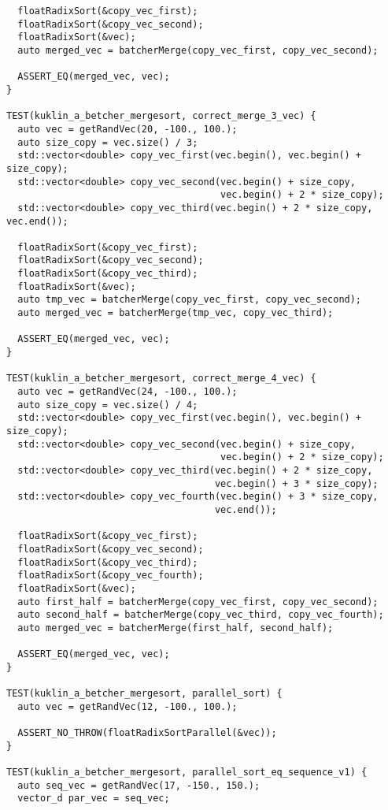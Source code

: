 \documentclass{report}
\begin{document}
\begin{lstlisting}
  floatRadixSort(&copy_vec_first);
  floatRadixSort(&copy_vec_second);
  floatRadixSort(&vec);
  auto merged_vec = batcherMerge(copy_vec_first, copy_vec_second);

  ASSERT_EQ(merged_vec, vec);
}

TEST(kuklin_a_betcher_mergesort, correct_merge_3_vec) {
  auto vec = getRandVec(20, -100., 100.);
  auto size_copy = vec.size() / 3;
  std::vector<double> copy_vec_first(vec.begin(), vec.begin() + size_copy);
  std::vector<double> copy_vec_second(vec.begin() + size_copy,
                                      vec.begin() + 2 * size_copy);
  std::vector<double> copy_vec_third(vec.begin() + 2 * size_copy, vec.end());

  floatRadixSort(&copy_vec_first);
  floatRadixSort(&copy_vec_second);
  floatRadixSort(&copy_vec_third);
  floatRadixSort(&vec);
  auto tmp_vec = batcherMerge(copy_vec_first, copy_vec_second);
  auto merged_vec = batcherMerge(tmp_vec, copy_vec_third);

  ASSERT_EQ(merged_vec, vec);
}

TEST(kuklin_a_betcher_mergesort, correct_merge_4_vec) {
  auto vec = getRandVec(24, -100., 100.);
  auto size_copy = vec.size() / 4;
  std::vector<double> copy_vec_first(vec.begin(), vec.begin() + size_copy);
  std::vector<double> copy_vec_second(vec.begin() + size_copy,
                                      vec.begin() + 2 * size_copy);
  std::vector<double> copy_vec_third(vec.begin() + 2 * size_copy,
                                     vec.begin() + 3 * size_copy);
  std::vector<double> copy_vec_fourth(vec.begin() + 3 * size_copy,
                                     vec.end());

  floatRadixSort(&copy_vec_first);
  floatRadixSort(&copy_vec_second);
  floatRadixSort(&copy_vec_third);
  floatRadixSort(&copy_vec_fourth);
  floatRadixSort(&vec);
  auto first_half = batcherMerge(copy_vec_first, copy_vec_second);
  auto second_half = batcherMerge(copy_vec_third, copy_vec_fourth);
  auto merged_vec = batcherMerge(first_half, second_half);

  ASSERT_EQ(merged_vec, vec);
}

TEST(kuklin_a_betcher_mergesort, parallel_sort) {
  auto vec = getRandVec(12, -100., 100.);

  ASSERT_NO_THROW(floatRadixSortParallel(&vec));
}

TEST(kuklin_a_betcher_mergesort, parallel_sort_eq_sequence_v1) {
  auto seq_vec = getRandVec(17, -150., 150.);
  vector_d par_vec = seq_vec;


\end{lstlisting}
\end{document}
